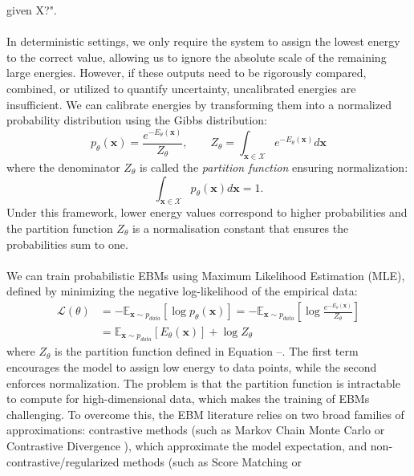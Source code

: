 given X?".  \\
\\
In deterministic settings, we only require the system to assign the lowest energy to the correct value, allowing us to ignore 
the absolute scale of the remaining large energies. However, if these outputs need to be rigorously compared, combined, or 
utilized to quantify uncertainty, uncalibrated energies are insufficient. We can calibrate energies by transforming them 
into a normalized probability distribution using the Gibbs distribution:
\begin{equation}
    p_{\theta}(\mathbf{x}) = \frac{e^{-E_{\theta}(\mathbf{x})}}{Z_{\theta}}, \qquad Z_{\theta}=\int_{\mathbf{x}\in\mathcal{X}} e^{-E_{\theta}(\mathbf{x})}d\mathbf{x}
\end{equation}
where the denominator $Z_{\theta}$ is called the \textit{partition function} ensuring normalization: 
\begin{equation}
    \int_{\mathbf{x}\in\mathcal{X}}p_{\theta}(\mathbf{x})d\mathbf{x} = 1.
\end{equation} 
Under this framework, lower energy values correspond to higher probabilities and the partition function $Z_{\theta}$ is a normalisation 
constant that ensures the probabilities sum to one. \\
\\
We can train probabilistic EBMs using Maximum Likelihood Estimation (MLE), defined by minimizing the negative log-likelihood 
of the empirical data:
\begin{align}
    \mathcal{L}(\theta) &= -\mathbb{E}_{\mathbf{x}\sim p_{data}}[\log p_{\theta}(\mathbf{x})] = -\mathbb{E}_{\mathbf{x}\sim p_{data}} \left[\log \frac{e^{-E_{\theta}(\mathbf{x})}}{Z_{\theta}}\right] \\
    & = \mathbb{E}_{\mathbf{x}\sim p_{data}} \left[E_{\theta}(\mathbf{x})\right] + \log Z_{\theta}
\end{align}
where $Z_{\theta}$ is the partition function defined in Equation --. The first term encourages the model to assign low energy to 
data points, while the second enforces normalization. The problem is that the partition function is intractable to compute for 
high-dimensional data, which makes the training of EBMs challenging. To overcome this, the EBM literature relies on two broad 
families of approximations: contrastive methods (such as Markov Chain Monte Carlo or Contrastive Divergence \cite{hinton2002training}), 
which approximate the model expectation, and non-contrastive/regularized methods (such as Score Matching \cite{hyvarinen2005estimation} or 
